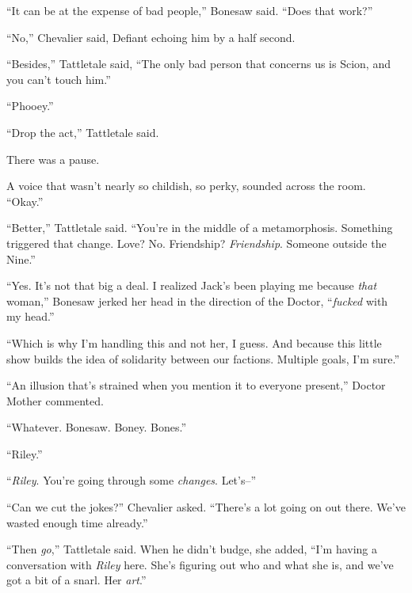 ``It can be at the expense of bad people,'' Bonesaw said.  ``Does that work?''



``No,'' Chevalier said, Defiant echoing him by a half second.



``Besides,'' Tattletale said, ``The only bad person that concerns us is Scion, and you can't touch him.''



``Phooey.''



``Drop the act,'' Tattletale said.



There was a pause.



A voice that wasn't nearly so childish, so perky, sounded across the room.  ``Okay.''



``Better,'' Tattletale said.  ``You're in the middle of a metamorphosis.  Something triggered that change.  Love?  No.  Friendship?  \emph{Friendship}.  Someone outside the Nine.''



``Yes.  It's not that big a deal.  I realized Jack's been playing me because \emph{that} woman,'' Bonesaw jerked her head in the direction of the Doctor, ``\emph{fucked} with my head.''



``Which is why I'm handling this and not her, I guess.  And because this little show builds the idea of solidarity between our factions.  Multiple goals, I'm sure.''



``An illusion that's strained when you mention it to everyone present,'' Doctor Mother commented.



``Whatever.  Bonesaw.  Boney.  Bones.''



``Riley.''



``\emph{Riley}.  You're going through some \emph{changes}.  Let's--''



``Can we cut the jokes?'' Chevalier asked.  ``There's a lot going on out there.  We've wasted enough time already.''



``Then \emph{go},'' Tattletale said.  When he didn't budge, she added, ``I'm having a conversation with \emph{Riley} here.  She's figuring out who and what she is, and we've got a bit of a snarl.  Her \emph{art}.''



